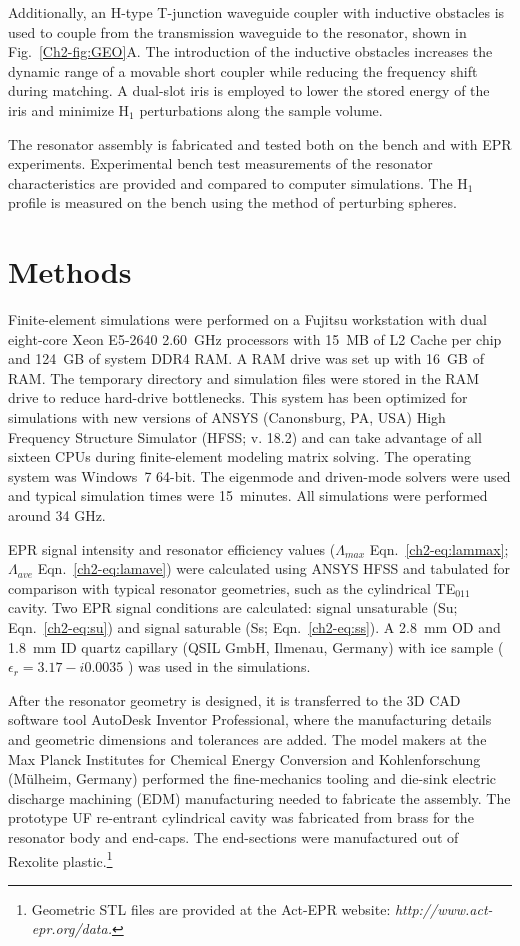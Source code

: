 Additionally, an H-type T-junction waveguide coupler with inductive obstacles is used to couple from the transmission waveguide to the resonator, shown in Fig.~\ref{Ch2-fig:GEO}A. The introduction of the inductive obstacles increases the dynamic range of a movable short coupler while reducing the frequency shift during matching. A dual-slot iris is employed to lower the stored energy of the iris and minimize H$_1$ perturbations along the sample volume. \cite{UFLGR2017}

The resonator assembly is fabricated and tested both on the bench and with EPR experiments. Experimental bench test measurements of the resonator characteristics are provided and compared to computer simulations. The H$_1$ profile is measured on the bench using the method of perturbing spheres. 

\section{Methods}
Finite-element simulations were performed on a Fujitsu workstation with dual eight-core Xeon E5-2640 2.60~GHz processors with 15~MB of L2 Cache per chip and 124~GB of system DDR4 RAM. A RAM drive was set up with 16~GB of RAM. The temporary directory and simulation files were stored in the RAM drive to reduce hard-drive bottlenecks. This system has been optimized for simulations with new versions of ANSYS (Canonsburg, PA, USA) High Frequency Structure Simulator (HFSS; v. 18.2) and can take advantage of all sixteen CPUs during finite-element modeling matrix solving. The operating system was Windows~7 64-bit. The eigenmode and driven-mode solvers were used and typical simulation times were 15~minutes. All simulations were performed around 34 GHz.

EPR signal intensity and resonator efficiency values ($\Lambda_{max}$ Eqn.~\ref{ch2-eq:lammax}; $\Lambda_{ave}$ Eqn.~\ref{ch2-eq:lamave}) were calculated using ANSYS HFSS \cite{misrabook} and tabulated for comparison with typical resonator geometries, such as the cylindrical TE$_{011}$ cavity. \cite{generalte011} Two EPR signal conditions are calculated: signal unsaturable (Su; Eqn.~\ref{ch2-eq:su}) and signal saturable (Ss; Eqn.~\ref{ch2-eq:ss}). A 2.8~mm OD and 1.8~mm ID quartz capillary (QSIL GmbH, Ilmenau, Germany) with ice sample ($\epsilon_r=3.17-i0.0035$ \cite{icedielectric} ) was used in the simulations.

After the resonator geometry is designed, it is transferred to the 3D CAD software tool AutoDesk Inventor Professional, where the manufacturing details and geometric dimensions and tolerances are added. The model makers at the Max Planck Institutes for Chemical Energy Conversion and Kohlenforschung (M\"ulheim, Germany) performed the fine-mechanics tooling and die-sink electric discharge machining (EDM) manufacturing needed to fabricate the assembly. The prototype UF re-entrant cylindrical \cylTE{} cavity was fabricated from brass for the resonator body and end-caps. The end-sections were manufactured out of Rexolite plastic.\footnote{Geometric STL files are provided at the Act-EPR website: \textit{http://www.act-epr.org/data.}}

